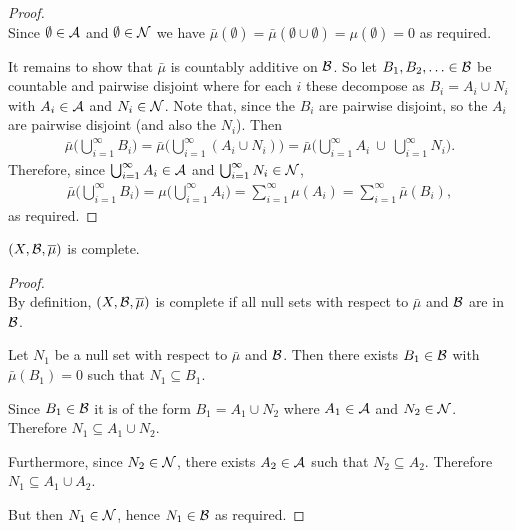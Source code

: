 \begin{proof}~\\
  Since $\emptyset \in \mathcal A$ and $\emptyset \in \mathcal N$ we
  have $\bar\mu(\emptyset) = \bar\mu(\emptyset \cup \emptyset) = \mu(\emptyset) = 0$ as required.

  It remains to show that $\bar\mu$ is countably additive on $\mathcal B$. So let $B_1, B_2, \ldots \in \mathcal B$ be
  countable and pairwise disjoint where for each $i$ these decompose as $B_i = A_i \cup N_i$
  with $A_i \in \mathcal A$ and $N_i \in \mathcal N$. Note that, since the $B_i$ are pairwise disjoint, so the $A_i$ are
  pairwise disjoint (and also the $N_i$). Then
  \begin{align*}
    \bar\mu\Big(\bigcup_{i=1}^\infty B_i\Big)
    = \bar\mu\Big(\bigcup_{i=1}^\infty (A_i \cup N_i)\Big)
    = \bar\mu\Big(\bigcup_{i=1}^\infty A_i ~\cup~ \bigcup_{i=1}^\infty N_i\Big).
  \end{align*}
  Therefore, since $\bigcup_{i=1}^\infty A_i \in \mathcal A$ and $\bigcup_{i=1}^\infty N_i \in \mathcal N$,
  \begin{align*}
    \bar\mu\Big(\bigcup_{i=1}^\infty B_i\Big)
    = \mu\Big(\bigcup_{i=1}^\infty A_i\Big)
    = \sum_{i=1}^\infty \mu(A_i)
    = \sum_{i=1}^\infty \bar\mu(B_i),
  \end{align*}
  as required.
\end{proof}

\begin{claim*}
  $(X, \mathcal B, \overline{\mu})$ is complete.
\end{claim*}

\begin{proof}~\\
  By definition, $(X, \mathcal B, \overline{\mu})$ is complete if all null sets with respect to $\bar\mu$ and $\mathcal B$ are
  in $\mathcal B$.

  Let $N_1$ be a null set with respect to $\bar\mu$ and $\mathcal B$. Then there exists $B_1 \in \mathcal B$
  with $\bar\mu(B_1) = 0$ such that $N_1 \subseteq B_1$.

  Since $B_1 \in \mathcal B$ it is of the form $B_1 = A_1 \cup N_2$ where $A_1 \in \mathcal A$ and $N_2 \in \mathcal N$. Therefore
  $N_1 \subseteq A_1 \cup N_2$.

  Furthermore, since $N_2 \in \mathcal N$, there exists $A_2 \in \mathcal A$ such that $N_2 \subseteq A_2$.
  Therefore $N_1 \subseteq A_1 \cup A_2$.

  But then $N_1 \in \mathcal N$, hence $N_1 \in \mathcal B$ as required.
\end{proof}

